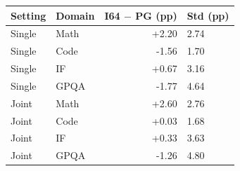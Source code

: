 \begin{tabular}{llrl}
\toprule
Setting & Domain & I64 $-$ PG (pp) & Std (pp) \\
\midrule
Single & Math & +2.20 & 2.74 \\
Single & Code & -1.56 & 1.70 \\
Single & IF & +0.67 & 3.16 \\
Single & GPQA & -1.77 & 4.64 \\
Joint & Math & +2.60 & 2.76 \\
Joint & Code & +0.03 & 1.68 \\
Joint & IF & +0.33 & 3.63 \\
Joint & GPQA & -1.26 & 4.80 \\
\bottomrule
\end{tabular}
